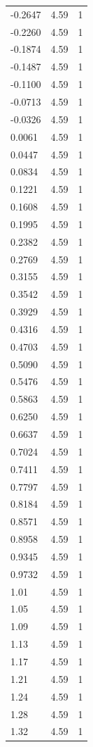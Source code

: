 \begin{longtable}{lrr}
  -0.2647 & 4.59 & 1 \\
  -0.2260 & 4.59 & 1 \\
  -0.1874 & 4.59 & 1 \\
  -0.1487 & 4.59 & 1 \\
  -0.1100 & 4.59 & 1 \\
  -0.0713 & 4.59 & 1 \\
  -0.0326 & 4.59 & 1 \\
  0.0061 & 4.59 & 1 \\
  0.0447 & 4.59 & 1 \\
  0.0834 & 4.59 & 1 \\
  0.1221 & 4.59 & 1 \\
  0.1608 & 4.59 & 1 \\
  0.1995 & 4.59 & 1 \\
  0.2382 & 4.59 & 1 \\
  0.2769 & 4.59 & 1 \\
  0.3155 & 4.59 & 1 \\
  0.3542 & 4.59 & 1 \\
  0.3929 & 4.59 & 1 \\
  0.4316 & 4.59 & 1 \\
  0.4703 & 4.59 & 1 \\
  0.5090 & 4.59 & 1 \\
  0.5476 & 4.59 & 1 \\
  0.5863 & 4.59 & 1 \\
  0.6250 & 4.59 & 1 \\
  0.6637 & 4.59 & 1 \\
  0.7024 & 4.59 & 1 \\
  0.7411 & 4.59 & 1 \\
  0.7797 & 4.59 & 1 \\
  0.8184 & 4.59 & 1 \\
  0.8571 & 4.59 & 1 \\
  0.8958 & 4.59 & 1 \\
  0.9345 & 4.59 & 1 \\
  0.9732 & 4.59 & 1 \\
  1.01 & 4.59 & 1 \\
  1.05 & 4.59 & 1 \\
  1.09 & 4.59 & 1 \\
  1.13 & 4.59 & 1 \\
  1.17 & 4.59 & 1 \\
  1.21 & 4.59 & 1 \\
  1.24 & 4.59 & 1 \\
  1.28 & 4.59 & 1 \\
  1.32 & 4.59 & 1 \\

\end{longtable}
